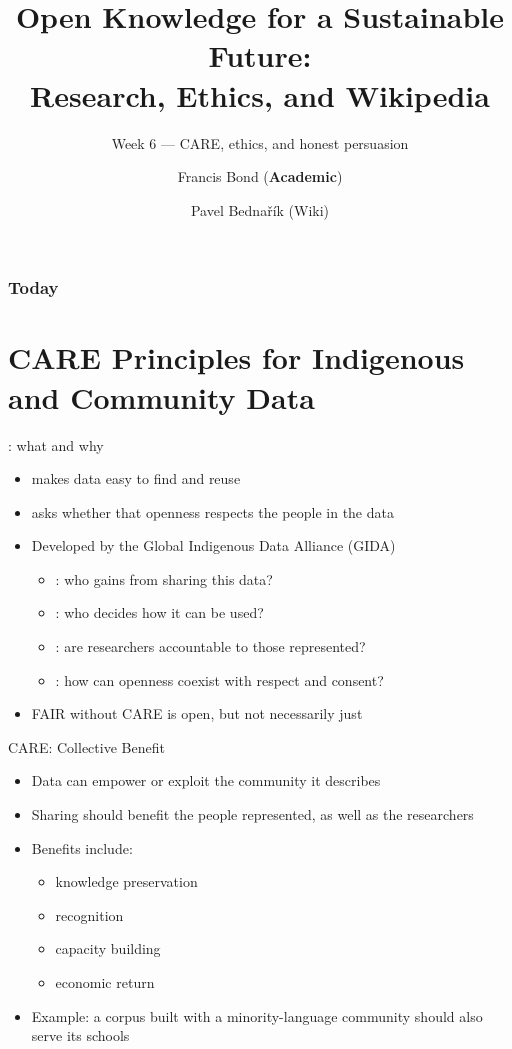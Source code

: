 \documentclass[aspectratio=169]{beamer}
\title[CARE]{Open Knowledge for a Sustainable Future:\\ Research, Ethics, and Wikipedia}
\subtitle{Week 6 --- CARE, ethics, and honest persuasion}
\author[Bond \& Bednařík]{Francis Bond (\textbf{Academic}) \and Pavel Bednařík (Wiki)}
\institute[UPOL \& Wikimedia]{Palacký University Olomouc \quad | \quad Wikimedia ČR}
\date{}
\begin{document}
\begin{frame}
  \titlepage
\end{frame}

\begin{frame}
  \frametitle{Today}
  \small
  \tableofcontents[hideallsubsections]
\end{frame}


\section{CARE Principles for Indigenous and Community Data}

\begin{frame}{: what and why}
\begin{itemize}
  \item {} makes data easy to find and reuse
  \item {} asks whether that openness respects the people in the data
  \item Developed by the Global Indigenous Data Alliance (GIDA) \citep{CARE2020}
    \begin{itemize}
    \item {}: who gains from sharing this data?
    \item {}: who decides how it can be used?
    \item {}: are researchers accountable to those represented?
    \item {}: how can openness coexist with respect and consent?
    \end{itemize}
  \item FAIR without CARE is open, but not necessarily just
\end{itemize}
\end{frame}

\begin{frame}{CARE: Collective Benefit}
\begin{itemize}
  \item Data can empower or exploit the community it describes
  \item Sharing should benefit the people represented, as well as the researchers
  \item Benefits include:
    \begin{itemize}
    \item knowledge preservation
    \item recognition
    \item capacity building
    \item economic return
    \end{itemize}
  \item Example: a corpus built with a minority-language community should also serve its schools
\end{itemize}
\end{frame}
\end{document}
